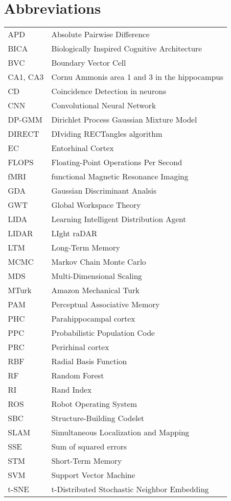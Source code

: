 \begin{table*}[!htb]
\begin{tabular}{ll}
\end{tabular}
\end{table*}

\clearpage

\section*{Abbreviations}

\begin{table*}[!htb]
\def\arraystretch{1.2}
\begin{tabular}{ll}
	APD		& Absolute Pairwise Difference \\
	BICA	& Biologically Inspired Cognitive Architecture \\
	BVC		& Boundary Vector Cell \\
	CA1, CA3 & Cornu Ammonis area 1 and 3 in the hippocampus \\
	CD		& Coincidence Detection in neurons \\
	CNN		& Convolutional Neural Network \\
	DP-GMM	& Dirichlet Process Gaussian Mixture Model \\
	DIRECT	& DIviding RECTangles algorithm \\
	EC		& Entorhinal Cortex \\
	FLOPS 	& Floating-Point Operations Per Second \\
	fMRI	& functional Magnetic Resonance Imaging \\
	GDA		& Gaussian Discriminant Analsis \\
	GWT		& Global Workspace Theory \\
	LIDA 	& Learning Intelligent Distribution Agent \\
	LIDAR	& LIght raDAR \\
	LTM		& Long-Term Memory \\
	MCMC	& Markov Chain Monte Carlo \\
	MDS		& Multi-Dimensional Scaling \\
	MTurk	& Amazon Mechanical Turk \\
	PAM		& Perceptual Associative Memory \\
	PHC 	& Parahippocampal cortex \\
	PPC 	& Probabilistic Population Code \\
	PRC		& Perirhinal cortex \\
	RBF		& Radial Basis Function \\
	RF		& Random Forest \\
	RI		& Rand Index \\
	ROS		& Robot Operating System \\
	SBC		& Structure-Building Codelet \\
	SLAM 	& Simultaneous Localization and Mapping \\
	SSE		& Sum of squared errors \\
	STM		& Short-Term Memory \\
	SVM 	& Support Vector Machine \\
	t-SNE	& t-Distributed Stochastic Neighbor Embedding \\
\end{tabular}
\end{table*}